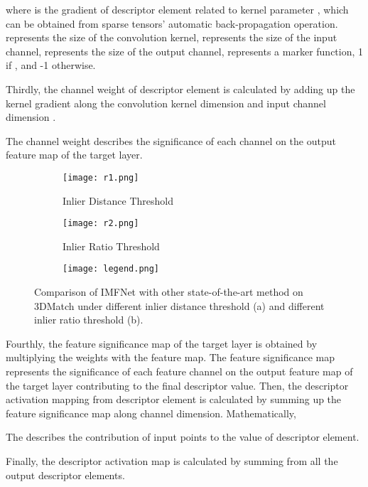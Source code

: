 \documentclass[10pt,twocolumn,letterpaper]{article}
\begin{document}
where  is the gradient of  descriptor element  related to kernel parameter , which can be obtained from sparse tensors' automatic back-propagation operation.  represents the size of the convolution kernel,  represents the size of the input channel,  represents the size of the output channel,  represents a marker function, 1 if , and -1 otherwise. 

Thirdly,  the channel weight of  descriptor element  is calculated by adding up the kernel gradient  along the convolution kernel dimension  and input channel dimension .

The channel weight  describes the significance of each channel on the output feature map of the target layer.

\begin{figure*}[h]
	\centering
	\begin{subfigure}{0.42\textwidth}
		\centering
		\texttt{[image: r1.png]} 
		\caption{Inlier Distance Threshold}
		\label{fig:subim1}
	\end{subfigure}
	\begin{subfigure}{0.42\textwidth}
		\centering
		\texttt{[image: r2.png]}
		\caption{Inlier Ratio Threshold}
		\label{fig:subim2}
	\end{subfigure}
	\begin{subfigure}{0.15\textwidth}
		\centering
		\texttt{[image: legend.png]}
		\label{b}
	\end{subfigure}
	\caption{Comparison of IMFNet with other state-of-the-art method on 3DMatch under different inlier distance threshold (a) and different inlier ratio threshold (b).}
	\label{fig:4}
\end{figure*}

Fourthly, the feature significance map of the target layer is obtained by multiplying the weights with the feature map. The feature significance map represents the significance of each feature channel on the output feature map of the target layer contributing to the final descriptor value. Then, the descriptor activation mapping from   descriptor element  is calculated by summing up the feature significance map along channel dimension. Mathematically,

The  describes the contribution of input points to the value of  descriptor element.

Finally, the descriptor activation map is calculated by summing  from all the  output descriptor elements.
\end{document}
